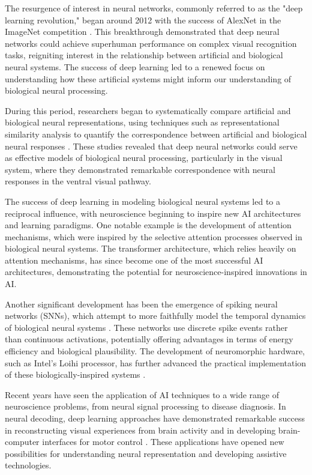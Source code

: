 \documentclass[conference]{IEEEtran}
\begin{document}
The resurgence of interest in neural networks, commonly referred to as the "deep learning revolution," began around 2012 with the success of AlexNet in the ImageNet competition \citep{litjensSurveyDeepLearning2017}. This breakthrough demonstrated that deep neural networks could achieve superhuman performance on complex visual recognition tasks, reigniting interest in the relationship between artificial and biological neural systems. The success of deep learning led to a renewed focus on understanding how these artificial systems might inform our understanding of biological neural processing.

During this period, researchers began to systematically compare artificial and biological neural representations, using techniques such as representational similarity analysis to quantify the correspondence between artificial and biological neural responses \citep{gucluDeepNeuralNetworks2015}. These studies revealed that deep neural networks could serve as effective models of biological neural processing, particularly in the visual system, where they demonstrated remarkable correspondence with neural responses in the ventral visual pathway.

The success of deep learning in modeling biological neural systems led to a reciprocal influence, with neuroscience beginning to inspire new AI architectures and learning paradigms. One notable example is the development of attention mechanisms, which were inspired by the selective attention processes observed in biological neural systems. The transformer architecture, which relies heavily on attention mechanisms, has since become one of the most successful AI architectures, demonstrating the potential for neuroscience-inspired innovations in AI.

Another significant development has been the emergence of spiking neural networks (SNNs), which attempt to more faithfully model the temporal dynamics of biological neural systems \citep{bellecLongShorttermMemory2018}. These networks use discrete spike events rather than continuous activations, potentially offering advantages in terms of energy efficiency and biological plausibility. The development of neuromorphic hardware, such as Intel's Loihi processor, has further advanced the practical implementation of these biologically-inspired systems \citep{daviesLoihiNeuromorphicManycore2018}.

Recent years have seen the application of AI techniques to a wide range of neuroscience problems, from neural signal processing to disease diagnosis. In neural decoding, deep learning approaches have demonstrated remarkable success in reconstructing visual experiences from brain activity \citep{mathisDecodingBrainNeural2024} and in developing brain-computer interfaces for motor control \citep{lawhernEEGNetCompactConvolutional2018}. These applications have opened new possibilities for understanding neural representation and developing assistive technologies.
\end{document}
